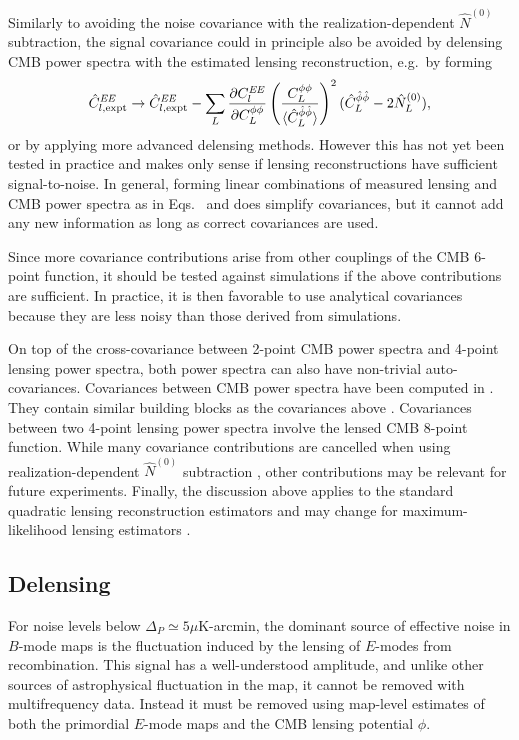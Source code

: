Similarly to avoiding the noise covariance with the realization-dependent $\hat N^{(0)}$ subtraction, the signal covariance could in principle also be avoided by delensing CMB power spectra with the estimated lensing reconstruction, e.g.~by forming \cite{marcel1308}
\begin{equation}
  \label{eq:matter_CV_mitigation}
  \hat{C}^{\mathit{EE}}_{l,\mathrm{expt}} \to  \hat{C}^{\mathit{EE}}_{l,\mathrm{expt}}- 
\sum_{L} 
 \frac{\partial C_{l}^{\mathit{EE}}}{\partial C_{L}^{\phi\phi}}
\left(\frac{C_{L}^{\phi\phi}}{\langle
\hat{C}_{L}^{\hat{\phi}\hat{\phi}}\rangle}\right)^2
(\hat{C}_{L}^{\hat{\phi}\hat{\phi}}-2\hat{N}_{L}^{(0)}),
\end{equation}
or by applying more advanced delensing methods.  However this has not yet been tested in practice and makes only sense if lensing reconstructions have sufficient signal-to-noise.  In general, forming linear combinations of measured lensing and CMB power spectra as in Eqs.~ and  does simplify covariances, but it cannot add any new information as long as correct covariances are used.


 Since more covariance contributions arise from other couplings of the CMB 6-point function, it should be tested against simulations if the above contributions are sufficient.  In practice, it is then favorable to use analytical covariances because they are less noisy than those derived from simulations.   
 
On top of the cross-covariance between 2-point CMB power spectra and 4-point lensing power spectra, both power spectra can also have non-trivial auto-covariances.  Covariances between CMB power spectra have been computed in \cite{2006PhRvD..74l3002S,2007PhRvD..75h3501L,BenoitSmithHu1205}. They contain similar building blocks as the covariances above \cite{BenoitSmithHu1205}.  Covariances between two 4-point lensing power spectra involve the lensed CMB 8-point function.  While many covariance contributions are cancelled when using realization-dependent $\hat N^{(0)}$ subtraction \cite{duncan1008}, other contributions may be relevant for future experiments.  Finally, the discussion above applies to the standard quadratic lensing reconstruction estimators and may change for maximum-likelihood lensing estimators \cite{HirataSeljak0209489}.

\subsection{Delensing}
For noise levels below $\Delta_P \simeq 5 \mu$K-arcmin,  the dominant source of effective noise in $B$-mode maps is the fluctuation induced by the lensing of $E$-modes from recombination.  This signal has a well-understood amplitude, and unlike other sources of astrophysical fluctuation in the map, it cannot be removed with multifrequency data.  Instead it must be removed using map-level estimates of both the primordial $E$-mode maps and the CMB lensing potential $\phi$.  

